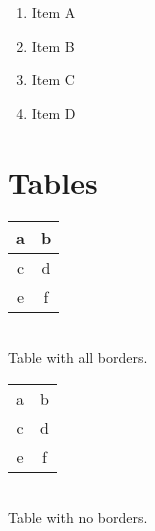 \documentclass[12pt, twoside]{book}
\begin{document}
\begin{enumerate}
    \item Item A
    \item Item B
    \item Item C
    \item Item D
\end{enumerate}

\section{Tables}

\begin{center}
        \begin{tabular}{|c|c|} \hline
        a & b \\ \hline
        c & d \\ \hline
        e & f \\ \hline
    \end{tabular} \\[12pt]
    Table with all borders.
\end{center}

\vspace{1cm}

\begin{center}
        \begin{tabular}{cc}
        a & b \\
        c & d \\
        e & f \\
    \end{tabular} \\[12pt]
    Table with no borders.
\end{center}
\end{document}
